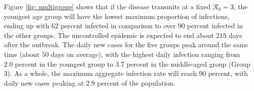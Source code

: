 \documentclass[12pt]{article}
\begin{document}
Figure \ref{fig: multigroup} shows that if the disease transmits at a fixed
$\mathcal{R}_{0}=3$, the youngest age group will have the lowest maximum
proportion of infections, ending up with $62$ percent infected in comparison
to over $90$ percent infected in the other groups. The uncontrolled epidemic
is expected to end about $215$ days after the outbreak. The daily new cases
for the five groups peak around the same time (about $50$ days on average),
with the highest daily infection ranging from $2.0$ percent in the youngest
group to $3.7$ percent in the middle-aged group (Group 3). As a whole, the
maximum aggregate infection rate will reach $90$ percent, with daily new cases
peaking at $2.9$ percent of the population.%

\end{document}
